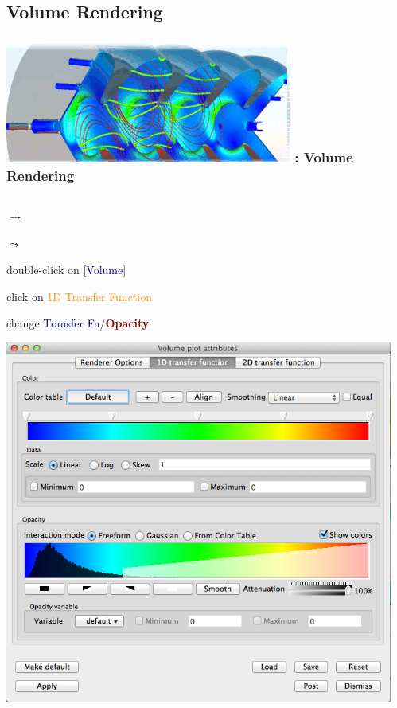 \subsection{Volume Rendering}
\begin{frame}
\frametitle{\href{https://wci.llnl.gov/simulation/computer-codes/visit/}{\includegraphics[height=.85cm]{figs/visit-logos/VisIt-02}} \hspace{-.85cm}{\bf \textcolor{lightgray}{VisIt}}: Volume Rendering}
\begin{columns}
\begin{column}{6.25cm}
\begin{beamerboxesrounded}[upper=block head,lower=block body,shadow=true]{}
	\textcolor{DarkBlue}{} 
			$\rightarrow$ \framebox{\bf \textcolor{DarkBlue}{Volume}}

			\hspace{5mm}
			$\leadsto$ \framebox{\textcolor{DarkGreen}{grad\_magnitude}}

	\pause
	\vspace{2mm}
	\textcolor{DarkBlue}{} 
		double-click on [\textcolor{DarkBlue}{Volume}]

	\vspace{.75mm}
	\hspace{3.5mm}
		click on \textcolor{DarkOrange}{1D  Transfer Function}

	\hspace{3.5mm}
		change \textcolor{DarkBlue}{Transfer Fn}/\textcolor{DarkRed}{\bf Opacity}
	\end{beamerboxesrounded}

	\centering
	\includegraphics[width=.65\columnwidth]{figs/visit-pract/VisIt_1dTransfFn}
\end{column}
\begin{column}{5.5cm}
\begin{beamerboxesrounded}[upper=block head,lower=block body,shadow=true]{}
	\hspace{3.5mm}


\end{beamerboxesrounded}
\end{column}
\end{columns}
\end{frame}
